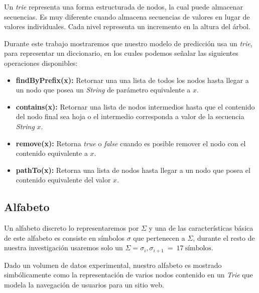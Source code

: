 Un \emph{trie} representa una forma  estructurada de nodos, la cual puede almacenar secuencias. %
Es muy diferente cuando almacena secuencias de valores en lugar de valores individuales. Cada nivel representa un incremento en la altura del árbol.


Durante este trabajo mostraremos que nuestro modelo de predicción usa un \emph{trie}, para representar un diccionario, en los cuales podemos señalar las siguientes operaciones disponibles:

	\begin{itemize}	
		\item \textbf{findByPrefix(x):}  Retornar una una lista de todos los nodos hasta llegar a un nodo que posea un \emph{String} de parámetro equivalente a $x$.
		
		\item \textbf{contains(x):} Retornar una lista de nodos intermedios hasta que el contenido del nodo final sea hoja o el intermedio corresponda a valor de la secuencia \emph{String} $x$.
		
		\item \textbf{remove(x):} Retorna \emph{true} o \emph{false} cuando es posible remover el nodo con el contenido equivalente a $x$.
		
		\item \textbf{pathTo(x):} Retorna una lista de nodos hasta llegar a un nodo que posea el contenido equivalente del valor $x$.
	\end{itemize}







\subsection{Alfabeto} \label{concept-alphabet}

Un alfabeto discreto lo representaremos por $\Sigma$ y una de las características básica de este alfabeto es consiste en símbolos $\sigma$ que pertenecen a $\Sigma$, durante el resto de nuestra investigación usaremos solo un $\Sigma = \sigma_{i},\sigma_{i+1}\ =\ 17\  \mbox{símbolos}$.



Dado un volumen de datos experimental, nuestro alfabeto es mostrado simbólicamente como la representación de varios nodos contenido en un \emph{Trie} que modela la navegación de usuarios para un sitio web.

